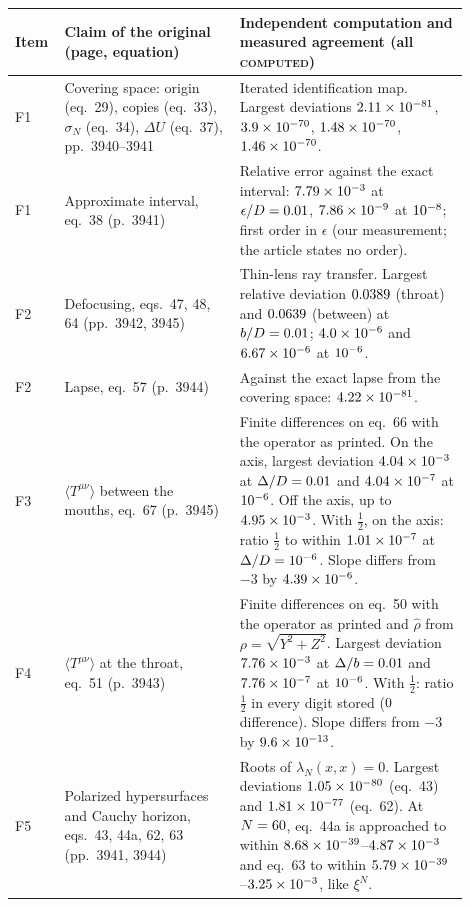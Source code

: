 \begin{table}[!htbp]
\centering\small
\begin{tabular}{>{\raggedright\arraybackslash}p{0.07\linewidth}>{\raggedright\arraybackslash}p{0.36\linewidth}>{\raggedright\arraybackslash}p{0.47\linewidth}}
\toprule
Item & Claim of the original (page, equation) & Independent computation and measured agreement (all \textsc{computed}) \\
\midrule
F1 & Covering space: origin (eq.~29), copies (eq.~33), $\sigma_N$ (eq.~34), $\Delta U$ (eq.~37), pp.~3940--3941 & Iterated identification map. Largest deviations $2.11\times10^{-81}$, $3.9\times10^{-70}$, $1.48\times10^{-70}$, $1.46\times10^{-70}$. \\
F1 & Approximate interval, eq.~38 (p.~3941) & Relative error against the exact interval: $7.79\times10^{-3}$ at $\epsilon/D = 0.01$, $7.86\times10^{-9}$ at $10^{-8}$; first order in $\epsilon$ (our measurement; the article states no order). \\
F2 & Defocusing, eqs.~47, 48, 64 (pp.~3942, 3945) & Thin-lens ray transfer. Largest relative deviation $0.0389$ (throat) and $0.0639$ (between) at $b/D = 0.01$; $4.0\times10^{-6}$ and $6.67\times10^{-6}$ at $10^{-6}$. \\
F2 & Lapse, eq.~57 (p.~3944) & Against the exact lapse from the covering space: $4.22\times10^{-81}$. \\
F3 & $\langle T^{\mu\nu}\rangle$ between the mouths, eq.~67 (p.~3945) & Finite differences on eq.~66 with the operator as printed. On the axis, largest deviation $4.04\times10^{-3}$ at $\Delta/D = 0.01$ and $4.04\times10^{-7}$ at $10^{-6}$. Off the axis, up to $4.95\times10^{-3}$. With $\tfrac12$, on the axis: ratio $\tfrac12$ to within $1.01\times10^{-7}$ at $\Delta/D = 10^{-6}$. Slope differs from $-3$ by $4.39\times10^{-6}$. \\
F4 & $\langle T^{\mu\nu}\rangle$ at the throat, eq.~51 (p.~3943) & Finite differences on eq.~50 with the operator as printed and $\hat\rho$ from $\rho=\sqrt{Y^2+Z^2}$. Largest deviation $7.76\times10^{-3}$ at $\Delta/b = 0.01$ and $7.76\times10^{-7}$ at $10^{-6}$. With $\tfrac12$: ratio $\tfrac12$ in every digit stored ($0$ difference). Slope differs from $-3$ by $9.6\times10^{-13}$. \\
F5 & Polarized hypersurfaces and Cauchy horizon, eqs.~43, 44a, 62, 63 (pp.~3941, 3944) & Roots of $\lambda_N(x,x)=0$. Largest deviations $1.05\times10^{-80}$ (eq.~43) and $1.81\times10^{-77}$ (eq.~62). At $N = 60$, eq.~44a is approached to within $8.68\times10^{-39}$--$4.87\times10^{-3}$ and eq.~63 to within $5.79\times10^{-39}$--$3.25\times10^{-3}$, like $\xi^N$. \\

\end{tabular}
\end{table}
